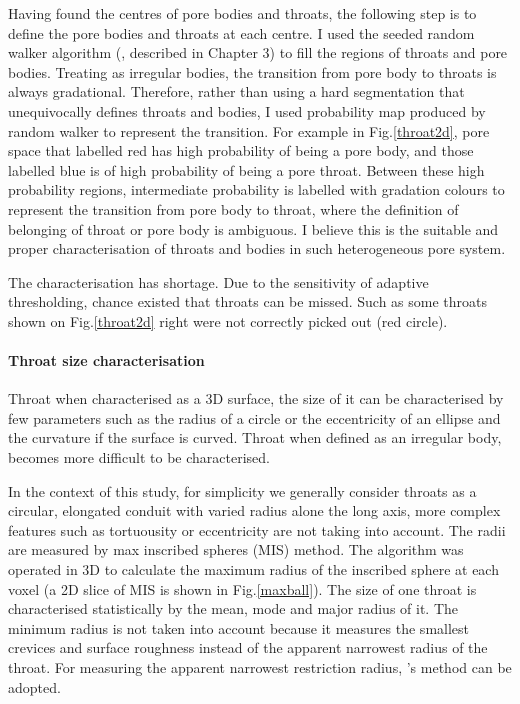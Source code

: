 Having found the centres of pore bodies and throats, the following step is to define the pore bodies and throats at each centre. I used the seeded random walker algorithm (\citet{grady2005multilabel}, described in Chapter 3) to fill the regions of throats and pore bodies. Treating as irregular bodies, the transition from pore body to throats is always gradational. Therefore, rather than using a hard segmentation that unequivocally defines throats and bodies, I used probability map produced by random walker to represent the transition. For example in Fig.\ref{throat2d}, pore space that labelled red has high probability of being a pore body, and those labelled blue is of high probability of being a pore throat. Between these high probability regions, intermediate probability is labelled with gradation colours to represent the transition from pore body to throat, where the definition of belonging of throat or pore body is ambiguous. I believe this is the suitable and proper characterisation of throats and bodies in such heterogeneous pore system.

The characterisation has shortage. Due to the sensitivity of adaptive thresholding, chance existed that throats can be missed. Such as some throats shown on Fig.\ref{throat2d} right were not correctly picked out (red circle).

\paragraph{Throat size characterisation}
Throat when characterised as a 3D surface, the size of it can be characterised by few parameters such as the radius of a circle or the eccentricity of an ellipse and the curvature if the surface is curved. Throat when defined as an irregular body, becomes more difficult to be characterised. 

In the context of this study, for simplicity we generally consider throats as a circular, elongated conduit with varied radius alone the long axis, more complex features such as tortuousity or eccentricity are not taking into account. The radii are measured by max inscribed spheres (MIS) method. The algorithm was operated in 3D to calculate the maximum radius of the inscribed sphere at each voxel (a 2D slice of MIS is shown in Fig.\ref{maxball}). The size of one throat is characterised statistically by the mean, mode and major radius of it. The minimum radius is not taken into account because it measures the smallest crevices and surface roughness instead of the apparent narrowest radius of the throat. For measuring the apparent narrowest restriction radius, \citet{singh2016imaging,wildenschild2013x}'s method can be adopted.

